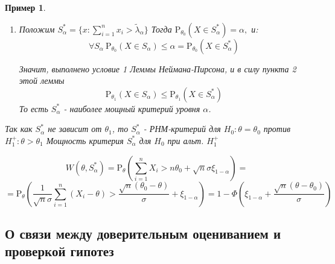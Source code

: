 \documentclass[12pt]{article}
\newtheorem*{example}{Пример}
\theoremstyle{basic_theorem}
\theoremstyle{name_theorem}
\def\P{
    \mathrm{P}
}
\begin{document}
\begin{example}
\begin{enumerate}
        \item Положим $S^*_{\alpha} = \{x: \sum_{i=1}^n x_i > \widetilde{\lambda}_\alpha\}$
            Тогда $\P_{\theta_0}(X\in S_\alpha^*)=\alpha,$ и: 
            $$\forall S_\alpha\ \P_{\theta_0}(X\in S_\alpha)\leq\alpha = \P_{\theta_0}(X\in S_\alpha^*)$$
        
            Значит, выполнено условие 1 Леммы Неймана-Пирсона, и в силу
            пункта 2 этой леммы
            $$\P_{\theta_1}(X\in S_\alpha) \leq \P_{\theta_1}(X\in S_\alpha^*)$$
            То есть $S_\alpha^*$ - наиболее мощный критерий уровня $\alpha$.
        \end{enumerate} 
        Так как $S^*_{\alpha}$ не зависит от $\theta_1$,
        то $S^*_{\alpha}$ - РНМ-критерий для $H_0: \theta = \theta_0$
        против $H^+_1 : \theta > \theta_1$
        Мощность критерия $S^*_{\alpha}$ для $H_0$ при альт. $H^+_1$

        $$W(\theta, S^*_{\alpha}) = \P_\theta\left(\sum_{i=1}^nX_i > n\theta_0 + \sqrt{n}\sigma\xi_{1-\alpha}\right) = $$
        $$ = \P_\theta\left(\frac{1}{\sqrt{n}\sigma} \sum_{i=1}^n(X_i - \theta) > \frac{\sqrt{n}(\theta_0 - \theta)}{\sigma} + \xi_{1-\alpha}\right) =
        1 - \Phi\left(\xi_{1-\alpha} + \frac{\sqrt{n}(\theta - \theta_0)}{\sigma}\right)$$
\end{example}

    \subsection*{О связи между доверительным оцениванием и проверкой гипотез}
\end{document}

